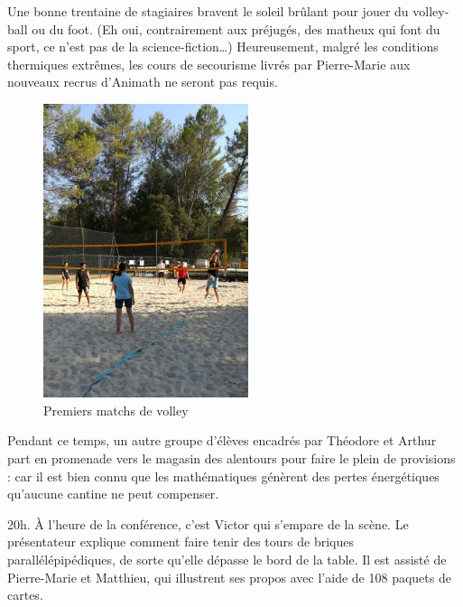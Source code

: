 Une bonne trentaine de stagiaires bravent le soleil brûlant pour jouer du volley-ball ou du foot. (Eh oui, contrairement aux préjugés, des matheux qui font du sport, ce n’est pas de la science-fiction…) Heureusement, malgré les conditions thermiques extrêmes, les cours de secourisme livrés par Pierre-Marie aux nouveaux recrus d’Animath ne seront pas requis.

\begin{figure}[H]
\centering\includegraphics[width=6cm]{CR-17-2.jpg}
\caption{Premiers matchs de volley}
\end{figure}

Pendant ce temps, un autre groupe d’élèves encadrés par Théodore et Arthur part en promenade vers le magasin des alentours pour faire le plein de provisions : car il est bien connu que les mathématiques génèrent des pertes énergétiques qu’aucune cantine ne peut compenser.

20h. À l’heure de la conférence, c’est Victor qui s’empare de la scène. Le présentateur explique comment faire tenir des tours de briques parallélépipédiques, de sorte qu’elle dépasse le bord de la table. Il est assisté de Pierre-Marie et Matthieu, qui illustrent ses propos avec l’aide de 108 paquets de cartes.

